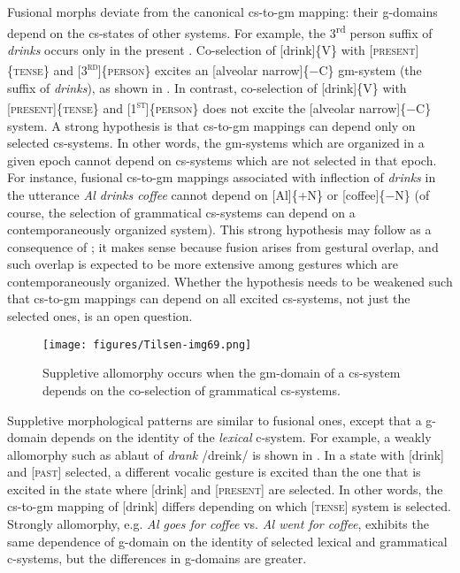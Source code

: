   Fusional morphs deviate from the canonical cs-to-gm mapping: their g-do\-mains depend on the cs-states of other systems. For example, the 3\textsuperscript{rd} person suffix of \textit{drinks} occurs only in the present . Co-selection of [drink]\{V\} with [\textsc{present}]\{\textsc{tense}\} and [\textsc{3}\textsc{\textsuperscript{rd}}]\{\textsc{person}\} excites an [alveolar narrow]\{−C\} gm-sys\-tem (the suffix of \textit{drinks}), as shown in {}. In contrast, co-selection of [drink]\linebreak\relax\{V\} with [\textsc{present]}\{\textsc{tense}\} and [\textsc{1}\textsc{\textsuperscript{st}}]\{\textsc{person}\} does not excite the [alveolar narrow]\linebreak\relax\{−C\} system. A strong hypothesis is that cs-to-gm mappings can depend only on selected cs-systems. In other words, the gm-sys\-tems which are organized in a given epoch cannot depend on cs-systems which are not selected in that epoch. For instance, fusional cs-to-gm mappings associated with inflection of \textit{drinks} in the utterance \textit{Al drinks coffee} cannot depend on [Al]\{+N\} or [coffee]\{−N\} (of course, the selection of grammatical cs-systems can depend on a contemporaneously organized system). This strong hypothesis may follow as a consequence of ; it makes sense because fusion arises from gestural overlap, and such overlap is expected to be more extensive among gestures which are contemporaneously organized. Whether the hypothesis needs to be weakened such that cs-to-gm mappings can depend on all excited cs-systems, not just the selected ones, is an open question.

  
\begin{figure}
\texttt{[image: figures/Tilsen-img69.png]}
\caption{Suppletive allomorphy occurs when the gm-domain of a cs-system depends on the co-selection of grammatical cs-systems.}
\label{fig:4:19}
\end{figure}
 

  Suppletive morphological patterns are similar to fusional ones, except that a  g-domain depends on the identity of the \textit{lexical} c-system. For example, a weakly  allomorphy such as ablaut of \textit{drank} /dreink/ is shown in {}. In a state with [drink] and [\textsc{past}] selected, a different vocalic gesture is excited than the one that is excited in the state where [drink] and [\textsc{present}] are selected. In other words, the cs-to-gm mapping of [drink] differs depending on which [\textsc{tense}] system is selected. Strongly  allomorphy, e.g. \textit{Al goes for coffee} vs. \textit{Al went for coffee}, exhibits the same dependence of g-domain on the identity of selected lexical and grammatical c-systems, but the differences in g-domains are greater.

